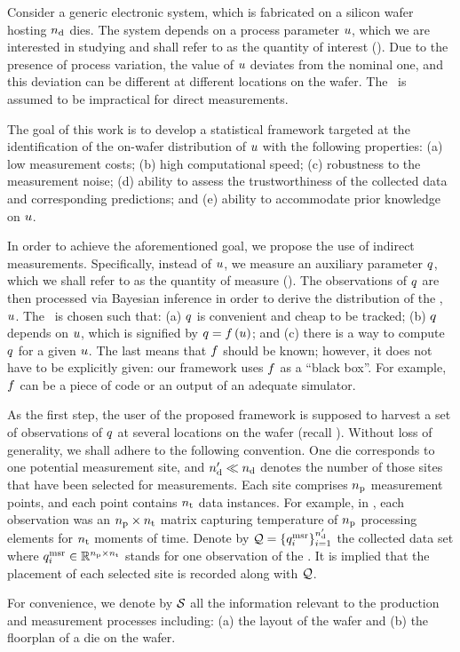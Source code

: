 Consider a generic electronic system, which is fabricated on a silicon wafer hosting ${n_\text{d}}$ dies.
The system depends on a process parameter $u$, which we are interested in studying and shall refer to as the quantity of interest (\qoi).
Due to the presence of process variation, the value of $u$ deviates from the nominal one, and this deviation can be different at different locations on the wafer.
The \qoi\ is assumed to be impractical for direct measurements.

The goal of this work is to develop a statistical framework targeted at the identification of the on-wafer distribution of $u$ with the following properties: (a) low measurement costs; (b) high computational speed; (c) robustness to the measurement noise; (d) ability to assess the trustworthiness of the collected data and corresponding predictions; and (e) ability to accommodate prior knowledge on $u$.

In order to achieve the aforementioned goal, we propose the use of indirect measurements.
Specifically, instead of $u$, we measure an auxiliary parameter $q$, which we shall refer to as the quantity of measure (\qom).
The observations of $q$ are then processed via Bayesian inference in order to derive the distribution of the \qoi, $u$.
The \qom\ is chosen such that: (a) $q$ is convenient and cheap to be tracked; (b) $q$ depends on $u$, which is signified by $\q = \oBB{\u}$; and (c) there is a way to compute $q$ for a given $u$.
The last means that $\oBB$ should be known; however, it does not have to be explicitly given: our framework uses $\oBB$ as a ``black box''.
For example, $\oBB$ can be a piece of code or an output of an adequate simulator.

As the first step, the user of the proposed framework is supposed to harvest a set of observations of $q$ at several locations on the wafer (recall ).
Without loss of generality, we shall adhere to the following convention.
One die corresponds to one potential measurement site, and ${n_\text{d}'} \ll {n_\text{d}}$ denotes the number of those sites that have been selected for measurements.
Each site comprises ${n_\text{p}}$ measurement points, and each point contains ${n_\text{t}}$ data instances.
For example, in , each observation was an ${n_\text{p}} \times {n_\text{t}}$ matrix capturing temperature of ${n_\text{p}}$ processing elements for ${n_\text{t}}$ moments of time.
Denote by $\mathcal{Q} = \{ q_i^{\text{msr}} \}_{i = 1}^{n_\text{d}'}$ the collected data set where $q_i^{\text{msr}} \in \mathbb{R}^{{n_\text{p}} \times {n_\text{t}}}$ stands for one observation of the \qom.
It is implied that the placement of each selected site is recorded along with $\mathcal{Q}$.

For convenience, we denote by $\mathcal{S}$ all the information relevant to the production and measurement processes including: (a) the layout of the wafer and (b) the floorplan of a die on the wafer.
